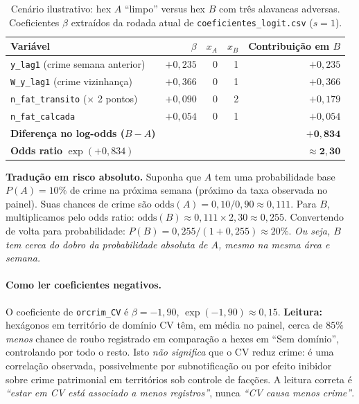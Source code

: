 \documentclass[11pt,a4paper]{article}
\begin{document}
\begin{table}[H]
  \centering
  \small
  \caption{Cenário ilustrativo: hex $A$ ``limpo'' versus hex $B$ com
  três alavancas adversas. Coeficientes $\beta$ extraídos da rodada
  atual de \texttt{coeficientes\_logit.csv} ($s{=}1$).}
  \label{tab:exemplo_interpret}
  \begin{tabular}{lrrrr}
    \toprule
    Variável & $\beta$ & $x_A$ & $x_B$ & Contribuição em $B$ \\
    \midrule
    \texttt{y\_lag1} (crime semana anterior)      & $+0{,}235$ & 0 & 1 & $+0{,}235$ \\
    \texttt{W\_y\_lag1} (crime vizinhança)        & $+0{,}366$ & 0 & 1 & $+0{,}366$ \\
    \texttt{n\_fat\_transito} (× 2 pontos)        & $+0{,}090$ & 0 & 2 & $+0{,}179$ \\
    \texttt{n\_fat\_calcada}                       & $+0{,}054$ & 0 & 1 & $+0{,}054$ \\
    \midrule
    \textbf{Diferença no log-odds ($B - A$)}      &            &   &   & $\mathbf{+0{,}834}$ \\
    \textbf{Odds ratio} $\exp(+0{,}834)$           &            &   &   & $\mathbf{\approx 2{,}30}$ \\
    \bottomrule
  \end{tabular}
\end{table}

\noindent\textbf{Tradução em risco absoluto.} Suponha que $A$ tem uma
probabilidade base $P(A) = 10\%$ de crime na próxima semana (próximo da
taxa observada no painel). Suas chances de crime são
$\text{odds}(A) = 0{,}10/0{,}90 \approx 0{,}111$. Para $B$, multiplicamos
pelo odds ratio: $\text{odds}(B) \approx 0{,}111 \times 2{,}30 \approx
0{,}255$. Convertendo de volta para probabilidade:
$P(B) = 0{,}255/(1+0{,}255) \approx 20\%$. \emph{Ou seja, $B$ tem cerca
do dobro da probabilidade absoluta de $A$, mesmo na mesma área e
semana.}

\paragraph{Como ler coeficientes negativos.} O coeficiente de
\texttt{orcrim\_CV} é $\beta = -1{,}90$, $\exp(-1{,}90) \approx
0{,}15$. \textbf{Leitura:} hexágonos em território de domínio CV têm,
em média no painel, cerca de $85\%$ \emph{menos} chance de roubo
registrado em comparação a hexes em ``Sem domínio'', controlando por
todo o resto. Isto \emph{não significa} que o CV reduz crime: é uma
correlação observada, possivelmente por subnotificação ou por efeito
inibidor sobre crime patrimonial em territórios sob controle de
facções. A leitura correta é \emph{``estar em CV está associado a
menos registros''}, nunca \emph{``CV causa menos crime''}.
\end{document}
